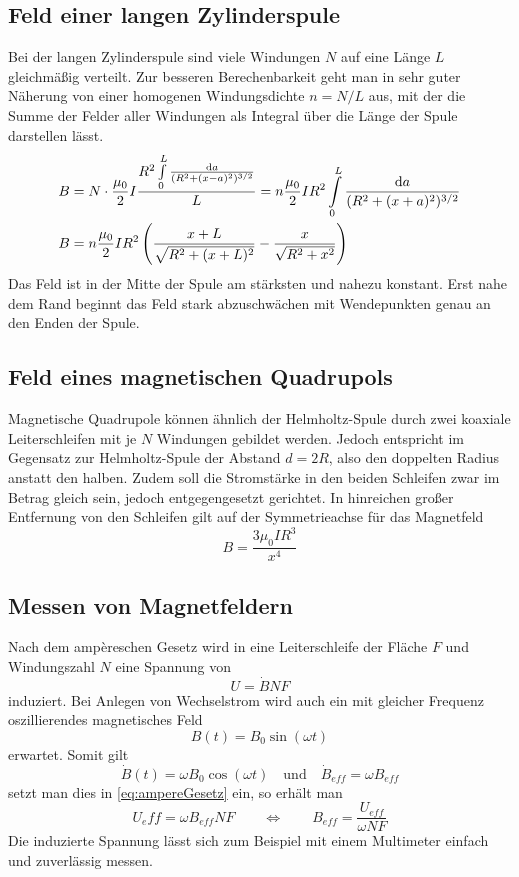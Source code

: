 \subsection{Feld einer langen Zylinderspule}
Bei der langen Zylinderspule sind viele Windungen $ N $ auf eine Länge $ L $ gleichmäßig verteilt. Zur besseren Berechenbarkeit geht man in sehr guter Näherung von einer homogenen Windungsdichte $ n = N/L $ aus, mit der die Summe der Felder aller Windungen als Integral über die Länge der Spule darstellen lässt.
\begin{align}
	B &= N\cdot\frac{\mu_0}{2} I \frac{R^2\int\limits_{0}^{L} \frac{\mathrm{d} a}{(R^2 + (x-a)^2)^{3/2}}}{L} = n \frac{\mu_0}{2} I R^2 \int\limits_{0}^{L} \frac{\mathrm{d} a}{(R^2 + (x+a)^2)^{3/2}} \notag \\
	B &= n \frac{\mu_0}{2} IR^2 \left(\frac{x + L}{\sqrt{R^2 + (x + L)^2}} - \frac{x}{\sqrt{R^2 + x^2}}\right)
\end{align}
Das Feld ist in der Mitte der Spule am stärksten und nahezu konstant. Erst nahe dem Rand beginnt das Feld stark abzuschwächen mit Wendepunkten genau an den Enden der Spule.

\subsection{Feld eines magnetischen Quadrupols}
Magnetische Quadrupole können ähnlich der Helmholtz-Spule durch zwei koaxiale Leiterschleifen mit je $ N $ Windungen gebildet werden. Jedoch entspricht im Gegensatz zur Helmholtz-Spule der Abstand $ d = 2R $, also den doppelten Radius anstatt den halben. Zudem soll die Stromstärke in den beiden Schleifen zwar im Betrag gleich sein, jedoch entgegengesetzt gerichtet. In hinreichen großer Entfernung von den Schleifen gilt auf der Symmetrieachse für das Magnetfeld
\begin{equation}
	B = \frac{3\mu_0IR^3}{x^4}
\end{equation}
\subsection{Messen von Magnetfeldern}
Nach dem ampèreschen Gesetz wird in eine Leiterschleife der Fläche $ F $ und Windungszahl $ N $ eine Spannung von 
\begin{equation}
	U = \dot{B} NF \label{eq:ampereGesetz}
\end{equation}
induziert. Bei Anlegen von Wechselstrom wird auch ein mit gleicher Frequenz oszillierendes magnetisches Feld \begin{equation}
	B(t) = B_0 \sin(\omega t)
\end{equation}
erwartet. Somit gilt
\begin{equation}
	\dot B(t) = \omega B_0 \cos(\omega t) \quad \text{und} \quad \dot B_{eff} = \omega B_{eff}
\end{equation}
setzt man dies in \eqref{eq:ampereGesetz} ein, so erhält man 
\begin{equation}
	U_eff = \omega B_{eff} NF \qquad \Leftrightarrow \qquad B_{eff} = \frac{U_{eff}}{\omega NF}
\end{equation}
Die induzierte Spannung lässt sich zum Beispiel mit einem Multimeter einfach und zuverlässig messen.
\newpage
